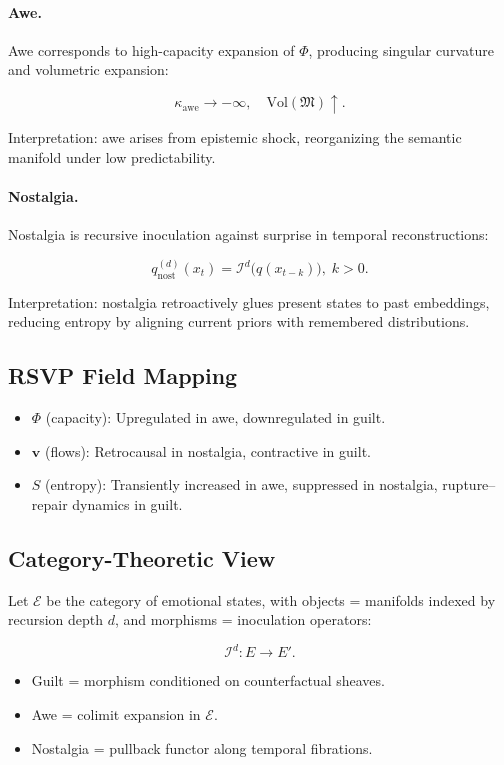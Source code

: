 \documentclass{article}
\theoremstyle{definition}
\begin{document}
\paragraph{Awe.}  
Awe corresponds to high-capacity expansion of $\Phi$, producing 
singular curvature and volumetric expansion:

\[
\kappa_{\text{awe}} \to -\infty, 
\quad \mathrm{Vol}(\mathfrak{M}) \uparrow.
\]

Interpretation: awe arises from epistemic shock, reorganizing the 
semantic manifold under low predictability.

\paragraph{Nostalgia.}  
Nostalgia is recursive inoculation against surprise in temporal 
reconstructions:

\[
q^{(d)}_{\text{nost}}(x_t) 
= \mathcal{I}^d\big(q(x_{t-k})\big),\; k>0.
\]

Interpretation: nostalgia retroactively glues present states to 
past embeddings, reducing entropy by aligning current priors 
with remembered distributions.

\subsection{RSVP Field Mapping}

\begin{itemize}
  \item $\Phi$ (capacity): Upregulated in awe, downregulated in guilt.  
  \item $\mathbf{v}$ (flows): Retrocausal in nostalgia, contractive in guilt.  
  \item $S$ (entropy): Transiently increased in awe, suppressed in nostalgia, 
        rupture–repair dynamics in guilt.  
\end{itemize}

\subsection{Category-Theoretic View}

Let $\mathcal{E}$ be the category of emotional states, 
with objects = manifolds indexed by recursion depth $d$, 
and morphisms = inoculation operators:

\[
\mathcal{I}^d : E \to E'.
\]

\begin{itemize}
  \item Guilt = morphism conditioned on counterfactual sheaves.  
  \item Awe = colimit expansion in $\mathcal{E}$.  
  \item Nostalgia = pullback functor along temporal fibrations.  
\end{itemize}
\end{document}
